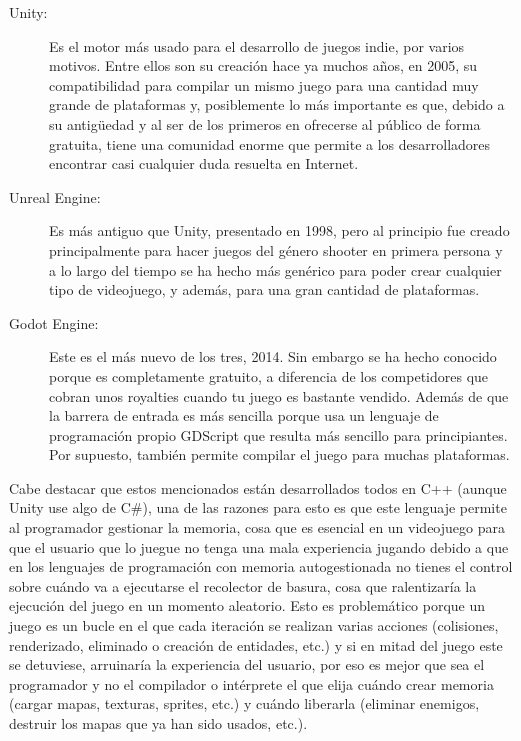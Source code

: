 \begin{description}
	\item[Unity:] Es el motor más usado para el desarrollo de juegos indie, por varios motivos. Entre ellos son su creación hace ya muchos años, en 2005, su compatibilidad para compilar un mismo juego para una cantidad muy grande de plataformas y, posiblemente lo más importante es que, debido a su antigüedad y al ser de los primeros en ofrecerse al público de forma gratuita, tiene una comunidad enorme que permite a los desarrolladores encontrar casi cualquier duda resuelta en Internet.
	\item[Unreal Engine:]  Es más antiguo que Unity, presentado en 1998, pero al principio fue creado principalmente para hacer juegos del género shooter en primera persona y a lo largo del tiempo se ha hecho más genérico para poder crear cualquier tipo de videojuego, y además, para una gran cantidad de plataformas. 
	\item[Godot Engine:] Este es el más nuevo de los tres, 2014. Sin embargo se ha hecho conocido porque es completamente gratuito, a diferencia de los competidores que cobran unos royalties cuando tu juego es bastante vendido. Además de que la barrera de entrada es más sencilla porque usa un lenguaje de programación propio GDScript que resulta más sencillo para principiantes. Por supuesto, también permite compilar el juego para muchas plataformas.
\end{description}

Cabe destacar que estos mencionados están desarrollados todos en C++ (aunque Unity use algo de C\#), una de las razones para esto es que este lenguaje permite al programador gestionar la memoria, cosa que es esencial en un videojuego para que el usuario que lo juegue no tenga una mala experiencia jugando debido a que en los lenguajes de programación con memoria autogestionada no tienes el control sobre cuándo va a ejecutarse el recolector de basura, cosa que ralentizaría la ejecución del juego en un momento aleatorio. Esto es problemático porque un juego es un bucle en el que cada iteración se realizan varias acciones (colisiones, renderizado, eliminado o creación de entidades, etc.) y si en mitad del juego este se detuviese, arruinaría la experiencia del usuario, por eso es mejor que sea el programador y no el compilador o intérprete el que elija cuándo crear memoria (cargar mapas, texturas, sprites, etc.) y cuándo liberarla (eliminar enemigos, destruir los mapas que ya han sido usados, etc.).


